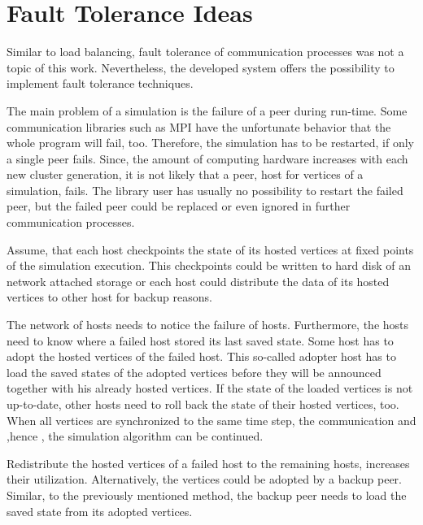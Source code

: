 \section{Fault Tolerance Ideas}

Similar to load balancing, fault tolerance of communication processes
was not a topic of this work. Nevertheless, the developed system
offers the possibility to implement fault tolerance techniques.

The main problem of a simulation is the failure of a peer during
run-time.  Some communication libraries such as MPI have the
unfortunate behavior that the whole program will fail, too. Therefore,
the simulation has to be restarted, if only a single peer fails.
Since, the amount of computing hardware increases with each new
cluster generation, it is not likely that a peer, host for
vertices of a simulation, fails. The library user has usually no
possibility to restart the failed peer, but the failed peer could be
replaced or even ignored in further communication processes.

Assume, that each host checkpoints the state of its hosted
vertices at fixed points of the simulation execution. This
checkpoints could be written to hard disk of an network attached
storage or each host could distribute the data of its hosted
vertices to other host for backup reasons.

The network of hosts needs to notice the failure of hosts.
Furthermore, the hosts need to know where a failed host stored its
last saved state.  Some host has to adopt the hosted vertices of the
failed host.  This so-called adopter host has to load the saved states
of the adopted vertices before they will be announced together with
his already hosted vertices.  If the state of the loaded vertices is
not up-to-date, other hosts need to roll back the state of their
hosted vertices, too.  When all vertices are synchronized to the same
time step, the communication and ,hence , the simulation algorithm can
be continued.


Redistribute the hosted vertices of a failed host to the remaining
hosts, increases their utilization.  Alternatively, the vertices could
be adopted by a backup peer.  Similar, to the previously mentioned
method, the backup peer needs to load the saved state from its adopted
vertices.

%


\cleardoublepage

